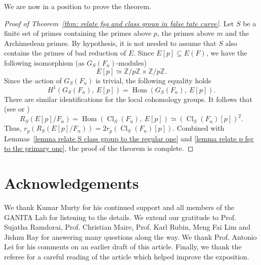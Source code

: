 \documentclass{amsart}
\DeclareMathOperator{\Hom}{Hom}
\DeclareMathOperator{\Cl}{Cl}
\newcommand{\ZZ}{\mathbb Z}
\theoremstyle{definition}
\theoremstyle{remark}
\begin{document}
We are now in a position to prove the theorem.
\begin{proof}[Proof of Theorem~\ref{thm: relate fsg and class group in false tate curve}]
Let $S$ be a finite set of primes containing the primes above $p$, the primes above $m$ and the Archimedean primes.
By hypothesis, it is not needed to assume that $S$ also contains the primes of bad reduction of $E$.
Since $E[p]\subseteq E(F)$, we have the following isomorphism (as $G_S(F_n)$-modules)
\[
E[p]\simeq \ZZ/p\ZZ \times \ZZ/p\ZZ.
\]
Since the action of $G_S(F_n)$ is trivial, the following equality holds
\[
H^1\left( G_S\left( F_n\right), \ E[p]\right) = \Hom \left( G_S\left( F_n\right), \ E[p]\right). 
\]
There are similar identifications for the local cohomology groups.
It follows that (see \cite[Lemma 3.8]{CS05} or \cite[Chapter I 6.1]{Rub00})
\[
R_S\left( E[p]/F_n\right) = \Hom\left( \Cl_S\left( F_n\right), \ E[p]\right) \simeq \left(\Cl_S\left( F_n\right)[p]\right)^2.
\]
Thus, $r_p \left( R_S\left( E[p]/F_n\right)\right) = 2 r_p \left( \Cl_S\left( F_n\right)[p]\right)$.
Combined with Lemmas~\ref{lemma relate S class group to the regular one} and \ref{lemma relate p fsg to the primary one}, the proof of the theorem is complete.
\end{proof}


\section*{Acknowledgements}
We thank Kumar Murty for his continued support and all members of the GANITA Lab for listening to the details.
We extend our gratitude to Prof. Sujatha Ramdorai, Prof. Christian Maire, Prof. Karl Rubin, Meng Fai Lim and Jishnu Ray for answering many questions along the way.
We thank Prof. Antonio Lei for his comments on an earlier draft of this article. 
Finally, we thank the referee for a careful reading of the article which helped improve the exposition.



\end{document}

